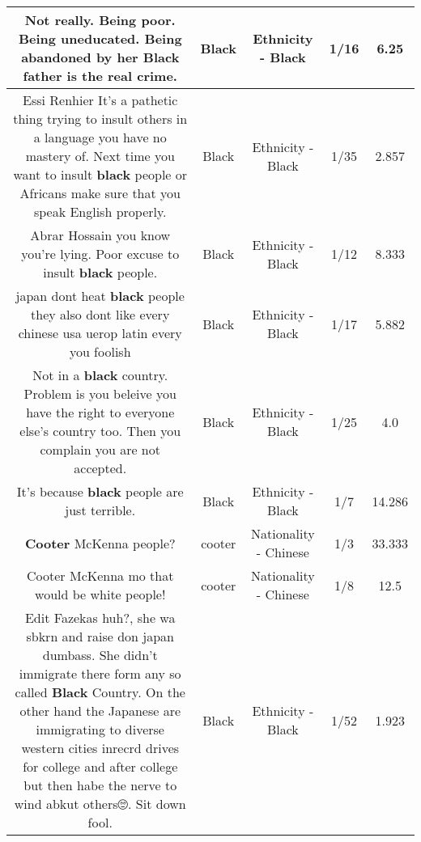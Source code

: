 \documentclass[11pt]{article}
\newlength\mylength
\begin{document}
\begin{center}
\begin{longtable}{|C{.65\mylength}|C{.30\mylength}|C{.12\mylength}|C{.12\mylength}|C{.12\mylength}|}
  \small Not really. Being poor. Being uneducated.  Being abandoned by her \textbf{Black} father is the real crime.\normalsize   & Black & Ethnicity - Black & 1/16 & 6.25 \\  \hline
  \small Essi Renhier It's a pathetic thing trying  to insult others in a language you have no mastery of. Next time you want to insult \textbf{black} people or Africans make sure that you speak English properly.\normalsize   & Black & Ethnicity - Black & 1/35 & 2.857 \\  \hline
  \small Abrar Hossain you know you're lying. Poor excuse to insult \textbf{black} people.\normalsize   & Black & Ethnicity - Black & 1/12 & 8.333 \\  \hline
  \small japan dont heat \textbf{black} people they also dont like every chinese usa uerop latin every you foolish\normalsize   & Black & Ethnicity - Black & 1/17 & 5.882 \\  \hline
  \small Not in a \textbf{black} country. Problem is you beleive you have the right to everyone else's country too. Then you complain you are not accepted.\normalsize   & Black & Ethnicity - Black & 1/25 & 4.0 \\  \hline
  \small It's because \textbf{black} people are just terrible.\normalsize   & Black & Ethnicity - Black & 1/7 & 14.286 \\  \hline
  \small \@\textbf{Cooter} McKenna people?\normalsize   & cooter & Nationality - Chinese & 1/3 & 33.333 \\  \hline
  \small Cooter McKenna mo that would be white people!\normalsize   & cooter & Nationality - Chinese & 1/8 & 12.5 \\  \hline
  \small Edit Fazekas huh?, she wa sbkrn and raise don japan dumbass. She didn't immigrate there form any so called \textbf{Black} Country. On the other hand the Japanese are immigrating to diverse western cities inrecrd drives for college and after college but then habe the nerve to wind abkut others🙄. Sit down fool.\normalsize   & Black & Ethnicity - Black & 1/52 & 1.923 \\  \hline

\end{longtable}
\end{center}
\end{document}
